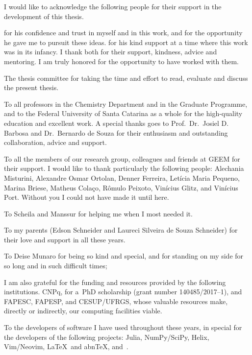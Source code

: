 \begin{agradecimentos}[Acknowledgements]
	I would like to acknowledge the following people for their support in the development of this thesis.

	\imprimirorientador{} for his confidence and trust in myself and in this work, and for the opportunity he gave me to pursuit these ideas.
	\imprimircoorientador{} for his kind support at a time where this work was in its infancy.
	I thank both for their support, kindness, advice and mentoring.
	I am truly honored for the opportunity to have worked with them.

	The thesis committee for taking the time and effort to read, evaluate and discuss the present thesis.

	To all professors in the Chemistry Department and in the Graduate Programme, and to the Federal University of Santa Catarina as a whole for the high-quality education and excellent work.
	A special thanks goes to Prof.\ Dr.\ Josiel D. Barbosa and Dr.\ Bernardo de Souza for their enthusiasm and outstanding collaboration, advice and support.

	To all the members of our research group, colleagues and friends at GEEM for their support.
	I would like to thank particularly the following people: Alechania Misturini, Alexandre Osmar Ortolan, Denner Ferreira, Letícia Maria Pequeno, Marina Briese, Matheus Colaço, Rômulo Peixoto, Vinícius Glitz, and Vinícius Port.
	Without you I could not have made it until here.

	To Scheila and Manssur for helping me when I most needed it.

	To my parents (Edson Schneider and Laureci Silveira de Souza Schneider) for their love and support in all these years.

	To Deise Munaro for being so kind and special, and for standing on my side for so long and in such difficult times;

	I am also grateful for the funding and resources provided by the following institutions.
	CNPq, for a~PhD scholarship (grant number 140485/2017--1), and FAPESC, FAPESP, and CESUP/UFRGS, whose valuable resources make, directly or indirectly, our computing facilities viable.

	To the developers of software I have used throughout these years, in special for the developers of the following projects: Julia, NumPy/SciPy, Helix, Vim/Neovim, \LaTeX\ and abn\TeX{}, and~\cclib{}.
\end{agradecimentos}
